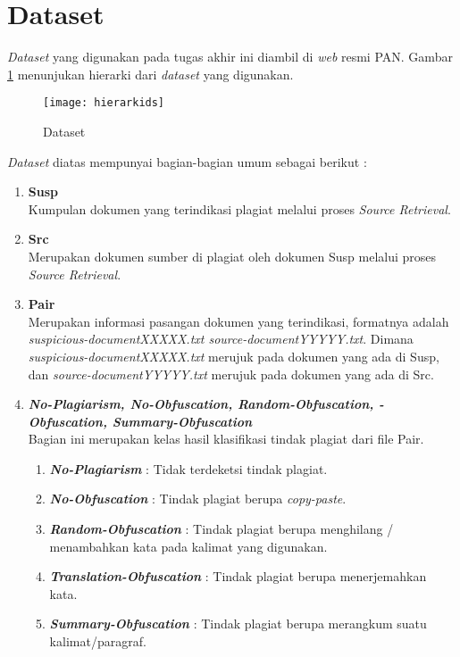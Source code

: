 \documentclass[../Proposal.tex]{subfiles}
\begin{document}
	\section{Dataset}
	\textit{Dataset} yang digunakan pada tugas akhir ini diambil di \textit{web} resmi PAN\cite{pan-task-2014}. Gambar \ref{fig:Dataset} menunjukan hierarki dari \textit{dataset} yang digunakan.
	
	\newpage
	
	\begin{figure}[h!]
		
		\texttt{[image: hierarkids]}
		\caption[Dataset]{Dataset}
		\label{fig:Dataset}
	\end{figure}
	
	\textit{Dataset} diatas mempunyai bagian-bagian umum sebagai berikut : 
	\begin{enumerate}
		\item \textbf{Susp}\\
		Kumpulan dokumen yang terindikasi plagiat melalui proses \textit{Source Retrieval}.
		\item \textbf{Src}\\
		Merupakan dokumen sumber di plagiat oleh dokumen Susp melalui proses \textit{Source Retrieval}.
		\item \textbf{Pair}\\
		Merupakan informasi pasangan dokumen yang terindikasi, formatnya adalah \textit{suspicious-documentXXXXX.txt source-documentYYYYY.txt}. Dimana \textit{suspicious-documentXXXXX.txt} merujuk pada dokumen yang ada di Susp, dan \textit{source-documentYYYYY.txt} merujuk pada dokumen yang ada di Src.
		\item \textbf{\textit{No-Plagiarism, No-Obfuscation, Random-Obfuscation, -Obfuscation, Summary-Obfuscation}}\\
		Bagian ini merupakan kelas hasil klasifikasi tindak plagiat dari file Pair.
		\begin{enumerate}
			\item \textit{\textbf{No-Plagiarism}} : Tidak terdeketsi tindak plagiat.
			\item \textit{\textbf{No-Obfuscation}} : Tindak plagiat berupa \textit{copy-paste}.
			\item \textit{\textbf{Random-Obfuscation}} : Tindak plagiat berupa menghilang / menambahkan kata pada kalimat yang digunakan.
			\item \textit{\textbf{Translation-Obfuscation}} : Tindak plagiat berupa menerjemahkan kata.
			\item \textit{\textbf{Summary-Obfuscation}} : Tindak plagiat berupa merangkum suatu kalimat/paragraf.
		\end{enumerate}
	\end{enumerate}
	
\end{document}
